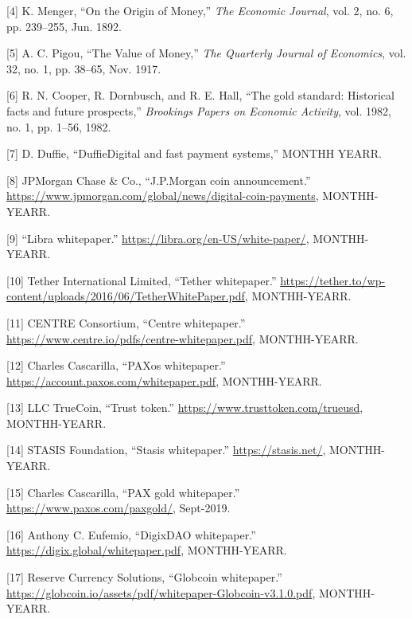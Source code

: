 \documentclass[english,]{IEEEtran}
\begin{document}
\hypertarget{ref-On_the_Origin_of_Money}{}
{[}4{]} K. Menger, ``On the Origin of Money,'' \emph{The Economic
Journal}, vol. 2, no. 6, pp. 239--255, Jun. 1892.

\hypertarget{ref-Value_of_Money}{}
{[}5{]} A. C. Pigou, ``The Value of Money,'' \emph{The Quarterly Journal
of Economics}, vol. 32, no. 1, pp. 38--65, Nov. 1917.

\hypertarget{ref-The_Gold_Standard}{}
{[}6{]} R. N. Cooper, R. Dornbusch, and R. E. Hall, ``The gold standard:
Historical facts and future prospects,'' \emph{Brookings Papers on
Economic Activity}, vol. 1982, no. 1, pp. 1--56, 1982.

\hypertarget{ref-DuffieDigital_and_Fast_Payment_Systems}{}
{[}7{]} D. Duffie, ``DuffieDigital and fast payment systems,'' MONTHH
YEARR.

\hypertarget{ref-JPMorgan_Coin:whitepaper}{}
{[}8{]} JPMorgan Chase \& Co., ``J.P.Morgan coin announcement.''
\url{https://www.jpmorgan.com/global/news/digital-coin-payments},
MONTHH-YEARR.

\hypertarget{ref-Libra:whitepaper}{}
{[}9{]} ``Libra whitepaper.''
\url{https://libra.org/en-US/white-paper/}, MONTHH-YEARR.

\hypertarget{ref-Tether:whitepaper}{}
{[}10{]} Tether International Limited, ``Tether whitepaper.''
\url{https://tether.to/wp-content/uploads/2016/06/TetherWhitePaper.pdf},
MONTHH-YEARR.

\hypertarget{ref-Centre:whitepaper}{}
{[}11{]} CENTRE Consortium, ``Centre whitepaper.''
\url{https://www.centre.io/pdfs/centre-whitepaper.pdf}, MONTHH-YEARR.

\hypertarget{ref-PAXos:whitepaper}{}
{[}12{]} Charles Cascarilla, ``PAXos whitepaper.''
\url{https://account.paxos.com/whitepaper.pdf}, MONTHH-YEARR.

\hypertarget{ref-TrueUSD:whitepaper}{}
{[}13{]} LLC TrueCoin, ``Trust token.''
\url{https://www.trusttoken.com/trueusd}, MONTHH-YEARR.

\hypertarget{ref-Stasis:whitepaper}{}
{[}14{]} STASIS Foundation, ``Stasis whitepaper.''
\url{https://stasis.net/}, MONTHH-YEARR.

\hypertarget{ref-PAXGold:whitepaper}{}
{[}15{]} Charles Cascarilla, ``PAX gold whitepaper.''
\url{https://www.paxos.com/paxgold/}, Sept-2019.

\hypertarget{ref-DigixDAO:whitepaper}{}
{[}16{]} Anthony C. Eufemio, ``DigixDAO whitepaper.''
\url{https://digix.global/whitepaper.pdf}, MONTHH-YEARR.

\hypertarget{ref-globcoin:whitepaper}{}
{[}17{]} Reserve Currency Solutions, ``Globcoin whitepaper.''
\url{https://globcoin.io/assets/pdf/whitepaper-Globcoin-v3.1.0.pdf},
MONTHH-YEARR.
\end{document}
